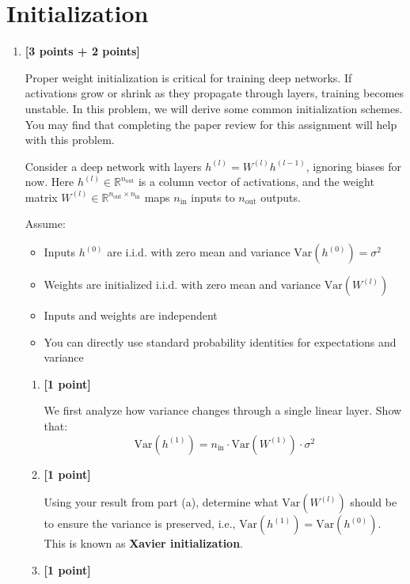 \documentclass[11pt,english]{article}
\begin{document}
\section{Initialization}
\begin{enumerate}[resume]
\item 
\textbf{[3 points + 2 points]}

Proper weight initialization is critical for training deep networks. If activations grow or shrink as they propagate through layers, training becomes unstable. In this problem, we will derive some common initialization schemes. You may find that completing the paper review for this assignment will help with this problem.

Consider a deep network with layers $h^{(l)} = W^{(l)} h^{(l-1)}$, ignoring biases for now. Here $h^{(l)} \in \mathbb{R}^{n_{\text{out}}}$ is a column vector of activations, and the weight matrix $W^{(l)} \in \mathbb{R}^{n_{\text{out}} \times n_{\text{in}}}$ maps $n_{\text{in}}$ inputs to $n_{\text{out}}$ outputs.

Assume:
\begin{itemize}
    \item Inputs $h^{(0)}$ are i.i.d. with zero mean and variance $\text{Var}(h^{(0)}) = \sigma^2$
    \item Weights are initialized i.i.d. with zero mean and variance $\text{Var}(W^{(l)})$
    \item Inputs and weights are independent
    \item You can directly use standard probability identities for expectations and variance
\end{itemize}

\begin{enumerate}[label=(\alph*)]

\item \textbf{[1 point]}

We first analyze how variance changes through a single linear layer. Show that:
\[
\text{Var}(h^{(1)}) = n_{\text{in}} \cdot \text{Var}(W^{(1)}) \cdot \sigma^2
\]

\item \textbf{[1 point]} 

Using your result from part (a), determine what $\text{Var}(W^{(l)})$ should be to ensure the variance is preserved, i.e., $\text{Var}(h^{(1)}) = \text{Var}(h^{(0)})$. This is known as \textbf{Xavier initialization}.

\item \textbf{[1 point]} 


\end{enumerate}
\end{enumerate}
\end{document}
